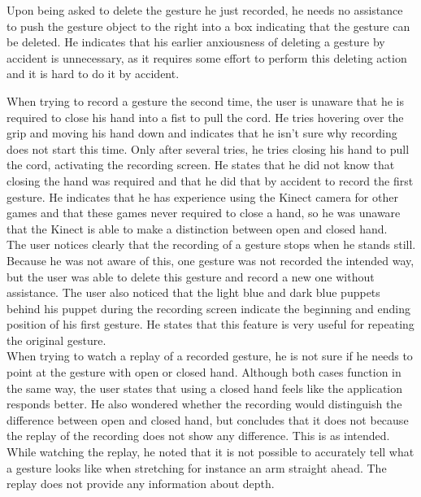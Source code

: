 Upon being asked to delete the gesture he just recorded, he needs no assistance to push the gesture object to the right into a box indicating that the gesture can be deleted. He indicates that his earlier anxiousness of deleting a gesture by accident is unnecessary, as it requires some effort to perform this deleting action and it is hard to do it by accident.\\

\newpage

When trying to record a gesture the second time, the user is unaware that he is required to close his hand into a fist to pull the cord. He tries hovering over the grip and moving his hand down and indicates that he isn't sure why recording does not start this time. Only after several tries, he tries closing his hand to pull the cord, activating the recording screen. He states that he did not know that closing the hand was required and that he did that by accident to record the first gesture. He indicates that he has experience using the Kinect camera for other games and that these games never required to close a hand, so he was unaware that the Kinect is able to make a distinction between open and closed hand.\\

The user notices clearly that the recording of a gesture stops when he stands still. Because he was not aware of this, one gesture was not recorded the intended way, but the user was able to delete this gesture and record a new one without assistance. The user also noticed that the light blue and dark blue puppets behind his puppet during the recording screen indicate the beginning and ending position of his first gesture. He states that this feature is very useful for repeating the original gesture.\\

When trying to watch a replay of a recorded gesture, he is not sure if he needs to point at the gesture with open or closed hand. Although both cases function in the same way, the user states that using a closed hand feels like the application responds better. He also wondered whether the recording would distinguish the difference between open and closed hand, but concludes that it does not because the replay of the recording does not show any difference. This is as intended. While watching the replay, he noted that it is not possible to accurately tell what a gesture looks like when stretching for instance an arm straight ahead. The replay does not provide any information about depth.\\

